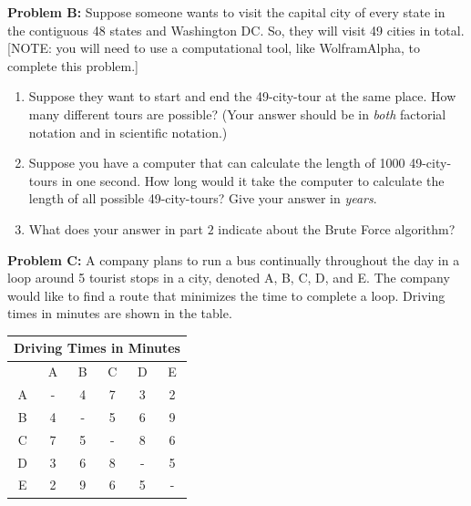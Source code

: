\documentclass[11pt, oneside]{article}   	%
\begin{document}
\textbf{Problem B:} Suppose someone wants to visit the capital city of every state in the contiguous 48 states and Washington DC. So, they will visit 49 cities in total. [NOTE: you will need to use a computational tool, like WolframAlpha, to complete this problem.]
	\begin{enumerate}
	\item Suppose they want to start and end the 49-city-tour at the same place. How many different tours are possible? (Your answer should be in \emph{both} factorial notation and in scientific notation.)
	\item Suppose you have a computer that can calculate the length of 1000 49-city-tours in one second. How long would it take the computer to calculate the length of all possible 49-city-tours? Give your answer in \emph{years}. 
	\item What does your answer in part $2$ indicate about the Brute Force algorithm?
	\end{enumerate}

%

\hrulefill

\textbf{Problem C:} A company plans to run a bus continually throughout
the day in a loop around 5 tourist stops in a city, denoted A, B, C,
D, and E. The company would like to find a route that minimizes the
time to complete a loop. Driving times in minutes are shown in the
table.

\begin{center}
\begin{tabular}{|c||c|c|c|c|c|}
\multicolumn{6}{c}{Driving Times in Minutes}\\
\hline
& {A} & {B} & {C} & {D} & {E} \\
\hline\hline
{A} & - & 4 & 7 & 3 & 2 \\
\hline
{B} & 4 & - & 5 & 6 & 9 \\
\hline
{C} & 7 & 5 & - & 8 & 6 \\
\hline
{D} & 3 & 6 & 8 & - & 5 \\
\hline
{E} & 2 & 9 & 6 & 5 & - \\
\hline
\end{tabular}
\end{center}
\end{document}
